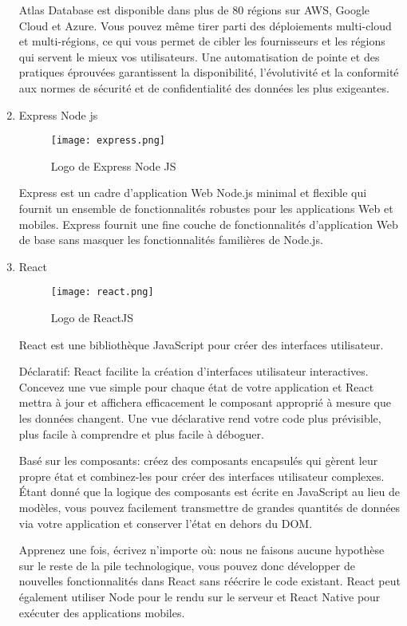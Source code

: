 \begin{enumerate}
        Atlas Database est disponible dans plus de 80 régions sur AWS, Google Cloud et Azure. Vous pouvez même tirer parti des déploiements multi-cloud et multi-régions, ce qui vous permet de cibler les fournisseurs et les régions qui servent le mieux vos utilisateurs. Une automatisation de pointe et des pratiques éprouvées garantissent la disponibilité, l'évolutivité et la conformité aux normes de sécurité et de confidentialité des données les plus exigeantes.
        \bfseries
        \item Express Node js\newline
        \begin{figure}[H]
            \centering
            \texttt{[image: express.png]}
            \caption{Logo de Express Node JS}\label{fig:express}
        \end{figure}
        \normalfont
        Express est un cadre d'application Web Node.js minimal et flexible qui fournit un ensemble  de fonctionnalités robustes pour les applications Web et mobiles. 
        Express fournit une fine couche de fonctionnalités d'application Web de base sans masquer les fonctionnalités familières de Node.js.
        \bfseries
        \item React\newline
        \begin{figure}[H]
            \centering
            \texttt{[image: react.png]}
            \caption{Logo de ReactJS}\label{fig:react}
        \end{figure}
        \normalfont
        React est une bibliothèque JavaScript pour créer des interfaces utilisateur. 

        Déclaratif: React facilite la création d'interfaces utilisateur interactives. Concevez une vue simple pour chaque état de votre application et React mettra à jour et affichera efficacement le composant approprié à mesure que les  données changent. Une vue déclarative rend votre code plus prévisible, plus facile à comprendre et plus facile à déboguer. 
 
        Basé sur les composants: créez des composants encapsulés qui gèrent leur propre état et combinez-les pour créer des interfaces utilisateur complexes. Étant donné que la logique des composants est écrite en JavaScript au lieu de modèles, vous pouvez facilement transmettre de grandes quantités de données  via votre application et conserver l'état en dehors du DOM.
 
        Apprenez une fois, écrivez n'importe où: nous ne faisons aucune hypothèse sur le reste de la pile technologique, vous pouvez donc développer de nouvelles fonctionnalités dans React sans réécrire le code existant. React peut également utiliser Node pour le rendu sur le serveur  et React Native pour exécuter des applications mobiles.

        \bfseries
    \end{enumerate}
